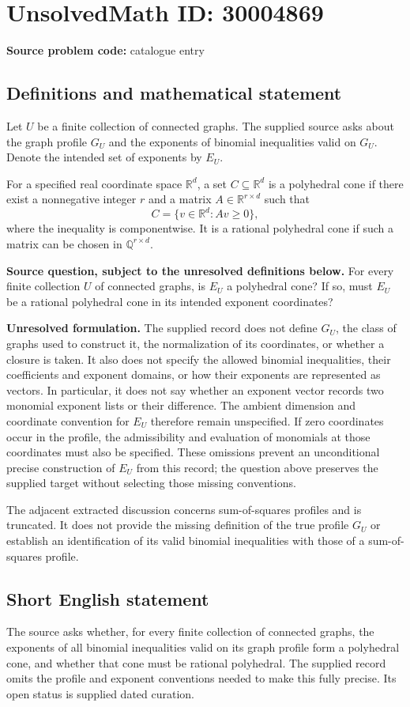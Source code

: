 \documentclass[11pt]{article}
\newcommand{\Q}{\mathbb{Q}}
\newcommand{\R}{\mathbb{R}}
\begin{document}
\section*{UnsolvedMath ID: 30004869}
\textbf{Source problem code:} catalogue entry
\subsection{Definitions and mathematical statement}
Let \(U\) be a finite collection of connected graphs. The supplied source asks about the graph profile \(G_U\) and the exponents of binomial inequalities valid on \(G_U\). Denote the intended set of exponents by \(E_U\).

For a specified real coordinate space \(\R^d\), a set \(C\subseteq\R^d\) is a polyhedral cone if there exist a nonnegative integer \(r\) and a matrix \(A\in\R^{r\times d}\) such that
\[
C=\{v\in\R^d:Av\geq 0\},
\]
where the inequality is componentwise. It is a rational polyhedral cone if such a matrix can be chosen in \(\Q^{r\times d}\).

\textbf{Source question, subject to the unresolved definitions below.} For every finite collection \(U\) of connected graphs, is \(E_U\) a polyhedral cone? If so, must \(E_U\) be a rational polyhedral cone in its intended exponent coordinates?

\textbf{Unresolved formulation.} The supplied record does not define \(G_U\), the class of graphs used to construct it, the normalization of its coordinates, or whether a closure is taken. It also does not specify the allowed binomial inequalities, their coefficients and exponent domains, or how their exponents are represented as vectors. In particular, it does not say whether an exponent vector records two monomial exponent lists or their difference. The ambient dimension and coordinate convention for \(E_U\) therefore remain unspecified. If zero coordinates occur in the profile, the admissibility and evaluation of monomials at those coordinates must also be specified. These omissions prevent an unconditional precise construction of \(E_U\) from this record; the question above preserves the supplied target without selecting those missing conventions.

The adjacent extracted discussion concerns sum-of-squares profiles and is truncated. It does not provide the missing definition of the true profile \(G_U\) or establish an identification of its valid binomial inequalities with those of a sum-of-squares profile.
\subsection{Short English statement}
The source asks whether, for every finite collection of connected graphs, the exponents of all binomial inequalities valid on its graph profile form a polyhedral cone, and whether that cone must be rational polyhedral. The supplied record omits the profile and exponent conventions needed to make this fully precise. Its open status is supplied dated curation.
\end{document}
